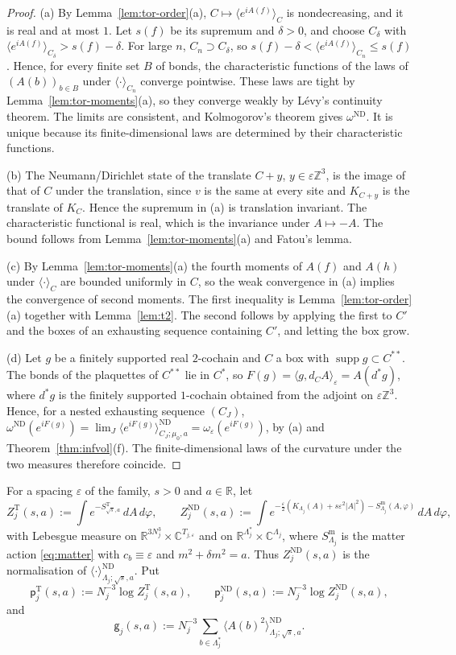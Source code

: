 \documentclass[11pt]{amsart}
\theoremstyle{plain}
\theoremstyle{definition}
\theoremstyle{remark}
\numberwithin{equation}{section}
\newcommand{\R}{\mathbb{R}}
\newcommand{\Z}{\mathbb{Z}}
\newcommand{\C}{\mathbb{C}}
\newcommand{\eps}{\varepsilon}
\newcommand{\abs}[1]{\lvert #1\rvert}
\newcommand{\ip}[2]{\langle #1,#2\rangle}
\newcommand{\ev}[1]{\langle #1\rangle}
\DeclareMathOperator{\supp}{supp}
\begin{document}
\begin{proof}
(a) By Lemma~\ref{lem:tor-order}(a), $C\mapsto\ev{e^{iA(f)}}_C$ is nondecreasing, and it is real and at most $1$. Let $s(f)$ be its supremum and $\delta>0$, and choose $C_\delta$ with $\ev{e^{iA(f)}}_{C_\delta}>s(f)-\delta$. For large $n$, $C_n\supset C_\delta$, so $s(f)-\delta<\ev{e^{iA(f)}}_{C_n}\le s(f)$. Hence, for every finite set $B$ of bonds, the characteristic functions of the laws of $(A(b))_{b\in B}$ under $\ev\cdot_{C_n}$ converge pointwise. These laws are tight by Lemma~\ref{lem:tor-moments}(a), so they converge weakly by L\'evy's continuity theorem. The limits are consistent, and Kolmogorov's theorem gives $\omega^{\mathrm{ND}}$. It is unique because its finite-dimensional laws are determined by their characteristic functions.

(b) The Neumann/Dirichlet state of the translate $C+y$, $y\in\eps\Z^3$, is the image of that of $C$ under the translation, since $v$ is the same at every site and $K_{C+y}$ is the translate of $K_C$. Hence the supremum in (a) is translation invariant. The characteristic functional is real, which is the invariance under $A\mapsto-A$. The bound follows from Lemma~\ref{lem:tor-moments}(a) and Fatou's lemma.

(c) By Lemma~\ref{lem:tor-moments}(a) the fourth moments of $A(f)$ and $A(h)$ under $\ev\cdot_C$ are bounded uniformly in $C$, so the weak convergence in (a) implies the convergence of second moments. The first inequality is Lemma~\ref{lem:tor-order}(a) together with Lemma~\ref{lem:t2}. The second follows by applying the first to $C'$ and the boxes of an exhausting sequence containing $C'$, and letting the box grow.

(d) Let $g$ be a finitely supported real $2$-cochain and $C$ a box with $\supp g\subset C^{**}$. The bonds of the plaquettes of $C^{**}$ lie in $C^*$, so $F(g)=\ip g{d_CA}_\eps=A(d^*g)$, where $d^*g$ is the finitely supported $1$-cochain obtained from the adjoint on $\eps\Z^3$. Hence, for a nested exhausting sequence $(C_J)$, $\omega^{\mathrm{ND}}(e^{iF(g)})=\lim_J\ev{e^{iF(g)}}^{\mathrm{ND}}_{C_J;\mu_0,a}=\omega_\eps(e^{iF(g)})$, by (a) and Theorem~\ref{thm:infvol}(f). The finite-dimensional laws of the curvature under the two measures therefore coincide.
\end{proof}

For a spacing $\eps$ of the family, $s>0$ and $a\in\R$, let
\[
Z^{\mathrm T}_j(s,a):=\int e^{-S^{\mathrm T}_{\sqrt s,a}}\,dA\,d\varphi,\qquad Z^{\mathrm{ND}}_j(s,a):=\int e^{-\frac\eps2(K_{\Lambda_j}(A)+s\eps^2\abs A^2)-S^{\mathrm m}_{\Lambda_j}(A,\varphi)}\,dA\,d\varphi ,
\]
with Lebesgue measure on $\R^{3N_j^3}\times\C^{T_{j,\eps}}$ and on $\R^{\Lambda_j^*}\times\C^{\Lambda_j}$, where $S^{\mathrm m}_{\Lambda_j}$ is the matter action \eqref{eq:matter} with $c_b\equiv\eps$ and $m^2+\delta m^2=a$. Thus $Z^{\mathrm{ND}}_j(s,a)$ is the normalisation of $\ev\cdot^{\mathrm{ND}}_{\Lambda_j;\sqrt s,a}$. Put
\[
\mathsf p^{\mathrm T}_j(s,a):=N_j^{-3}\log Z^{\mathrm T}_j(s,a),\qquad\mathsf p^{\mathrm{ND}}_j(s,a):=N_j^{-3}\log Z^{\mathrm{ND}}_j(s,a),
\]
and
\[
\mathsf g_j(s,a):=N_j^{-3}\sum_{b\in\Lambda_j^*}\ev{A(b)^2}^{\mathrm{ND}}_{\Lambda_j;\sqrt s,a}.
\]
\end{document}
